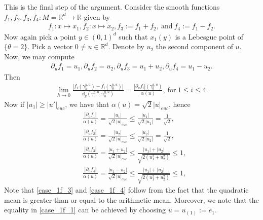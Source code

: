 \documentclass[a4paper,10pt]{article}
\numberwithin{equation}{section}
\newcommand{\R}{\mathbb{R}}
\newcommand{\sfd}{\mathsf d}
\begin{document}
This is the final step of the argument.
Consider the smooth functions $f_1, f_2, f_3, f_4: M = \R^d \to \R$ given by
\begin{align*}
    f_1: x \mapsto x_1, f_2: x \mapsto x_2, f_3 := f_1+f_2, \ \mathrm{and} \ f_4 := f_1-f_2. 
\end{align*}
Now again pick a point $y\in (0,1)^d$ such that $x_1(y)$ is a Lebesgue point of $\{\theta=2\}$. Pick a vector $0 \neq u \in \R^d$. Denote by $u_2$ the second component of $u$. Now, we may compute
\begin{align*}
    \partial_uf_1 = u_1, \partial_uf_2 = u_2, \partial_uf_3 = u_1+u_2, \partial_u f_4 = u_1-u_2.
\end{align*}
Then \begin{align*}
    \lim_{h \to 0} \frac{|f_i(\gamma^{y,u}_h) -f_i(\gamma^{y,u}_0)|}{\sfd_g(\gamma^{y,u}_0, \gamma^{y,u}_h)} = \frac{|\partial_u f_i|(\gamma_0^{y,u})}{\alpha(u)}, \ \mathrm{ for\ } 1 \leq i \leq 4.
\end{align*}
Now if $|u_1|\geq |u'|_{euc}$, we have that $\alpha(u) = \sqrt{2}|u|_{euc}$, hence
\begin{align}
    &\frac{|\partial_u f_1|}{\alpha(u)} = \frac{|u_1|}{\sqrt{2}|u|_{euc}} \leq \frac{|u_1|}{\sqrt{2}|u_1|}= \frac{1}{\sqrt{2}},\label{case_1f_1}\\
    &\frac{|\partial_u f_2|}{\alpha(u)} = \frac{|u_2|}{\sqrt{2}|u|_{euc}} \leq \frac{|u_2|}{\sqrt{2}|u_2|}= \frac{1}{\sqrt{2}},\label{case_1f_2}\\
    &\frac{|\partial_u f_3|}{\alpha(u)} = \frac{|u_1+u_2|}{\sqrt{2}|u|_{euc}} \leq \frac{|u_1|+|u_2|}{\sqrt{2(u_1^2+u_2^2)}}\leq 1,\label{case_1f_3}\\
    &\frac{|\partial_u f_4|}{\alpha(u)} = \frac{|u_1-u_2|}{\sqrt{2}|u|_{euc}} \leq \frac{|u_1|+|u_2|}{\sqrt{2(u_1^2+u_2^2)}}\leq 1\label{case_1f_4},
\end{align}
Note that \eqref{case_1f_3} and \eqref{case_1f_4} follow from the fact that the quadratic mean is greater than or equal to the arithmetic mean. Moreover, we note that the equality in \eqref{case_1f_1} can be achieved by choosing $u= u_{(1)}:=e_1$. 
\end{document}
